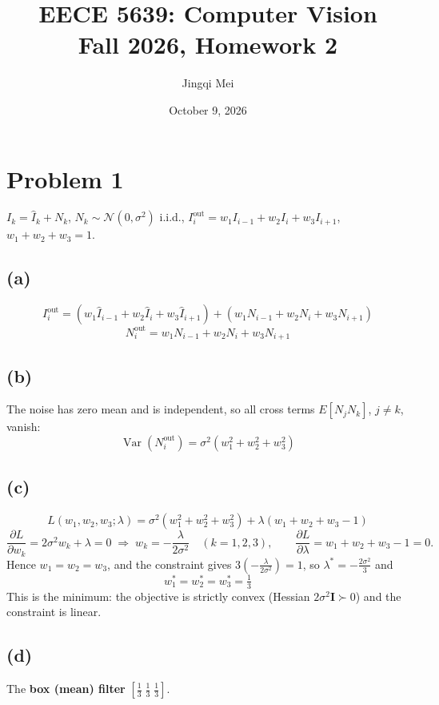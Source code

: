 \documentclass[11pt]{article}
\title{EECE 5639: Computer Vision\\Fall 2026, Homework 2}
\author{Jingqi Mei}
\date{October 9, 2026}
\begin{document}
\maketitle

\section*{Problem 1}
$I_k = \hat I_k + N_k$, \; $N_k \sim \mathcal N(0,\sigma^2)$ i.i.d., \;
$I_i^{\text{out}} = w_1 I_{i-1} + w_2 I_i + w_3 I_{i+1}$, \; $w_1+w_2+w_3=1$.

\subsection*{(a)}
\[
I_i^{\text{out}} = \left(w_1\hat I_{i-1} + w_2\hat I_i + w_3\hat I_{i+1}\right) + \left(w_1N_{i-1} + w_2N_i + w_3N_{i+1}\right)
\]
\[
\boxed{N_i^{\text{out}} = w_1N_{i-1} + w_2N_i + w_3N_{i+1}}
\]

\subsection*{(b)}
The noise has zero mean and is independent, so all cross terms $E[N_jN_k]$, $j\neq k$, vanish:
\[
\boxed{\operatorname{Var}(N_i^{\text{out}}) = \sigma^2\left(w_1^2+w_2^2+w_3^2\right)}
\]

\subsection*{(c)}
\[
L(w_1,w_2,w_3;\lambda) = \sigma^2\left(w_1^2+w_2^2+w_3^2\right) + \lambda\left(w_1+w_2+w_3-1\right)
\]
\[
\frac{\partial L}{\partial w_k} = 2\sigma^2 w_k + \lambda = 0 \;\Rightarrow\; w_k = -\frac{\lambda}{2\sigma^2}\quad (k=1,2,3),
\qquad
\frac{\partial L}{\partial \lambda} = w_1+w_2+w_3-1 = 0.
\]
Hence $w_1=w_2=w_3$, and the constraint gives $3\left(-\frac{\lambda}{2\sigma^2}\right)=1$, so $\lambda^*=-\frac{2\sigma^2}{3}$ and
\[
\boxed{w_1^* = w_2^* = w_3^* = \tfrac13}
\]
This is the minimum: the objective is strictly convex (Hessian $2\sigma^2\mathbf I \succ 0$) and the constraint is linear.

\subsection*{(d)}
The \textbf{box (mean) filter} $\left[\tfrac13\;\tfrac13\;\tfrac13\right]$.
\end{document}
